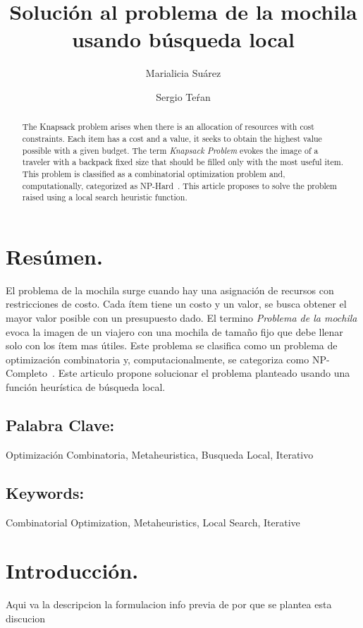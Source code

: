 \documentclass{ci5652}
\title{Solución al problema de la mochila usando búsqueda local}
\author{Marialicia Suárez
        \and
        Sergio Teŕan}
\begin{document}
\thispagestyle{empty}
\maketitle


\section*{Resúmen.}
El problema de la mochila surge cuando hay una asignación de recursos con restricciones de costo. Cada ítem tiene un costo y un valor, se busca obtener el mayor valor posible con un presupuesto dado. El termino \textit{Problema de la mochila} evoca la imagen de un viajero con una mochila de tamaño fijo que debe llenar solo con los ítem mas útiles. Este problema se clasifica como un problema de optimización combinatoria y, computacionalmente, se categoriza como NP-Completo~\cite{c_resumen_01}. Este articulo propone solucionar el problema planteado usando una función heurística de búsqueda local.

\subsection*{Palabra Clave:}
Optimización Combinatoria, Metaheuristica, Busqueda Local, Iterativo 

\begin{abstract}
The Knapsack problem arises when there is an allocation of resources with cost constraints. Each item has a cost and a value, it seeks to obtain the highest value possible with a given budget. The term \textit{Knapsack Problem} evokes the image of a traveler with a backpack fixed size that should be filled only with the most useful item. This problem is classified as a combinatorial optimization problem and, computationally, categorized as NP-Hard~\cite{c_resumen_01}. This article proposes to solve the problem raised using a local search heuristic function.
\end{abstract}

\subsection*{Keywords:}
Combinatorial Optimization, Metaheuristics, Local Search, Iterative

\section{Introducción.}
Aqui va la descripcion
la formulacion
info previa de por que se plantea esta discucion
\end{document}
